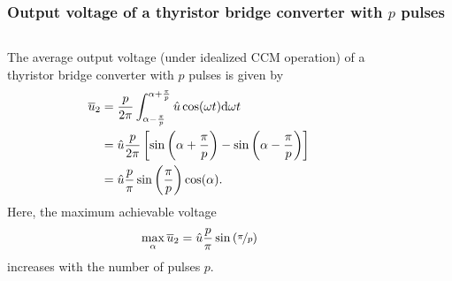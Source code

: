 \begin{frame}
    \frametitle{Output voltage of a thyristor bridge converter with $p$ pulses}
    \begin{columns}
        \begin{column}{0.5\textwidth}
            The average output voltage (under idealized CCM operation) of a thyristor bridge converter with $p$ pulses is given by
            \begin{align}
                    \overline{u}_2 &= \frac{p}{2\pi} \int_{\alpha-\frac{\pi}{p}}^{\alpha+\frac{\pi}{p}}\hat{u} \cos(\omega t) \mathrm{d}\omega t\notag\\
                                   &=\hat{u}\frac{p}{2\pi}\left[\sin\left(\alpha+\frac{\pi}{p}\right)- \sin\left(\alpha-\frac{\pi}{p}\right)\right]\notag\\
                                   &= \hat{u}\frac{p}{\pi}\sin\left(\frac{\pi}{p}\right)\cos(\alpha\vphantom{\frac{\pi}{p}}). 
            \end{align}
            Here, the maximum achievable voltage
            \begin{equation}
                \max_{\alpha} \overline{u}_2 = \hat{u}\frac{p}{\pi}\sin\left(\nicefrac{\pi}{p}\right)
            \end{equation}
            increases with the number of pulses $p$.
        \end{column}
        \begin{column}{0.5\textwidth}
            \begin{figure}
\end{figure}
\end{column}
\end{columns}
\end{frame}
